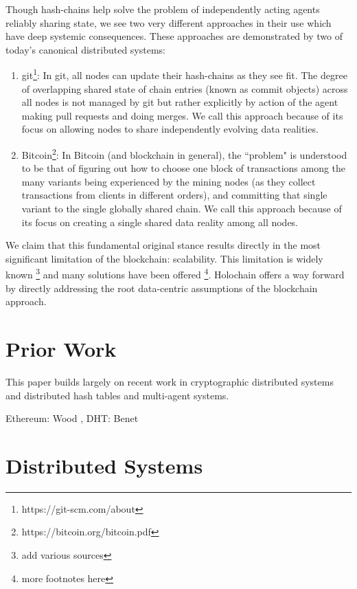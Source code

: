 \documentclass[twocolumn,showpacs,%
  nofootinbib,aps,superscriptaddress,%
  eqsecnum,prd,notitlepage,showkeys,10pt]{revtex4-1}
\begin{document}
Though hash-chains help solve the problem of independently acting agents reliably sharing state, we see two very different approaches in their use which have deep systemic consequences.  These approaches are demonstrated by two of today's canonical distributed systems: \begin{enumerate}
\item git\footnote{https://git-scm.com/about}:  In git, all nodes can update their hash-chains as they see fit.  The degree of overlapping shared state of chain entries (known as commit objects) across all nodes is not managed by git but rather explicitly by action of the agent making pull requests and doing merges.  We call this approach  because of its focus on allowing nodes to share independently evolving data realities.
\item Bitcoin\footnote{https://bitcoin.org/bitcoin.pdf}: In Bitcoin (and blockchain in general), the ``problem" is understood to be that of figuring out how to choose one block of transactions among the many variants being experienced by the mining nodes (as they collect transactions from clients in different orders), and committing that single variant to the single globally shared chain. We call this approach  because of its focus on creating a single shared data reality among all nodes.
\end{enumerate}

We claim that this fundamental original stance results directly in the most significant limitation of the blockchain: scalability.  This limitation is widely known \footnote{add various sources} and many solutions have been offered \footnote{more footnotes here}.  Holochain offers a way forward by directly addressing the root data-centric assumptions of the blockchain approach.

\section{Prior Work}
This paper builds largely on recent work in cryptographic distributed systems and distributed hash tables and multi-agent systems.

Ethereum: Wood \cite{yellowpaper}, DHT: \cite{kademlia}  Benet \cite{ipfs}



\section{Distributed Systems}
\label{sec:data-centric-systems}
\end{document}
